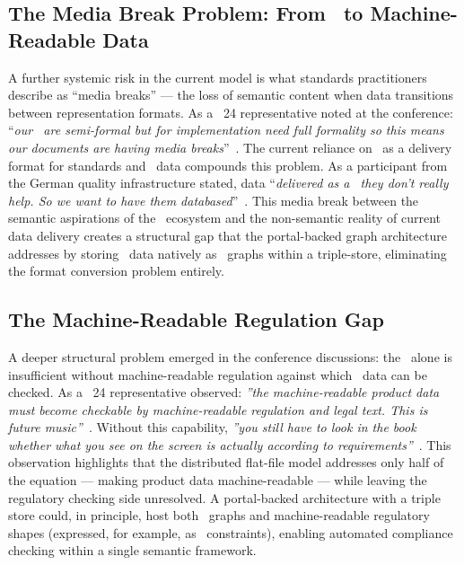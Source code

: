 \subsection{The Media Break Problem: From \PDF\ to Machine-Readable Data}

A further systemic risk in the current model is what standards practitioners
describe as ``media breaks'' --- the loss of semantic content when data
transitions between representation formats. As a \JTC~24 representative noted at
the conference: ``\textit{our \API\ are semi-formal but for implementation need
full formality so this means our documents are having media
breaks}''~\cite{conf_media_break}. The current reliance on \PDF\ as a delivery
format for standards and \DPP\ data compounds this problem. As a participant
from the German quality infrastructure stated, data ``\textit{delivered as a
\PDF\ they don't really help. So we want to have them
databased}''~\cite{conf_pdf}. This media break between the semantic aspirations
of the \DPP\ ecosystem and the non-semantic reality of current data delivery
creates a structural gap that the portal-backed graph architecture addresses by
storing \DPP\ data natively as \RDF\ graphs within a triple-store, eliminating
the format conversion problem entirely.

\subsection{The Machine-Readable Regulation Gap}

A deeper structural problem emerged in the conference discussions: the \DPP\
alone is insufficient without machine-readable regulation against which \DPP\
data can be checked. As a \JTC~24 representative observed: \textit{''the
machine-readable product data must become checkable by machine-readable
regulation and legal text. This is future
music''}~\cite{conf_machine_regulation}. Without this capability, \textit{''you
still have to look in the book whether what you see on the screen is actually
according to requirements''}~\cite{conf_checkable}. This observation highlights
that the distributed flat-file model addresses only half of the equation ---
making product data machine-readable --- while leaving the regulatory checking
side unresolved. A portal-backed architecture with a triple store could, in
principle, host both \DPP\ graphs and machine-readable regulatory shapes
(expressed, for example, as \SHACL\ constraints), enabling automated compliance
checking within a single semantic framework.

